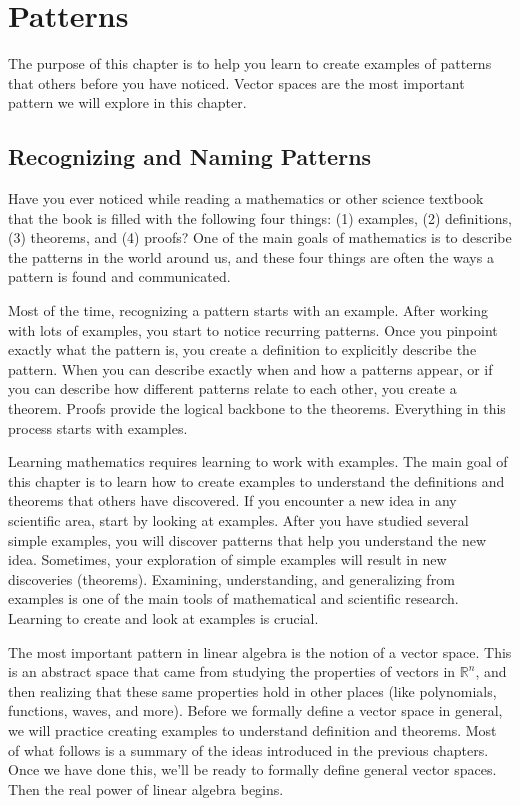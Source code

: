 \chapter{Patterns}


The purpose of this chapter is to help you learn to create examples of patterns that others before you have noticed. Vector spaces are the most important pattern we will explore in this chapter.



\section{Recognizing and Naming Patterns}

Have you ever noticed while reading a mathematics or other science textbook that the book is filled with the following four things: (1) examples, (2) definitions, (3) theorems, and (4) proofs? One of the main goals of mathematics is to describe the patterns in the world around us, and these four things are often the ways a pattern is found and communicated.  

Most of the time, recognizing a pattern starts with an example.  After working with lots of examples, you start to notice recurring patterns. Once you pinpoint exactly what the pattern is, you create a definition to explicitly describe the pattern. When you can describe exactly when and how a patterns appear, or if you can describe how different patterns relate to each other, you create a theorem. Proofs provide the logical backbone to the theorems. Everything in this process starts with examples.  

Learning mathematics requires learning to work with examples. The main goal of this chapter is to learn how to create examples to understand the definitions and theorems that others have discovered.  If you encounter a new idea in any scientific area, start by looking at examples.  After you have studied several simple examples, you will discover patterns that help you understand the new idea.  Sometimes, your exploration of simple examples will result in new discoveries (theorems). Examining, understanding, and generalizing from examples is one of the main tools of mathematical and scientific research.  Learning to create and look at examples is crucial.

The most important pattern in linear algebra is the notion of a vector space. This is an abstract space that came from studying the properties of vectors in $\mathbb{R}^n$, and then realizing that these same properties hold in other places (like polynomials, functions, waves, and more). Before we formally define a vector space in general, we will practice creating examples to understand definition and theorems.  Most of what follows is a summary of the ideas introduced in the previous chapters. Once we have done this, we'll be ready to formally define general vector spaces. Then the real power of linear algebra begins.

